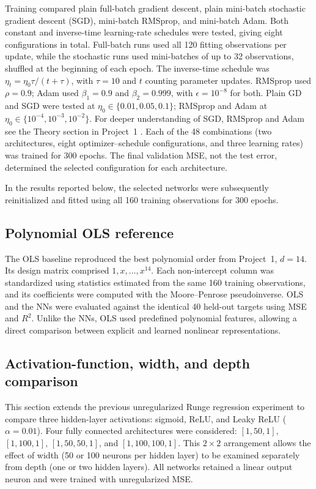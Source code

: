 \documentclass[aps,rmp,reprint,amsmath,amssymb,graphicx,longbibliography]{revtex4-1}
\begin{document}
Training compared plain full-batch gradient descent, plain mini-batch
stochastic gradient descent (SGD), mini-batch RMSprop, and mini-batch
Adam. Both constant and inverse-time learning-rate schedules were
tested, giving eight configurations in total. Full-batch runs used all
120 fitting observations per update, while the stochastic runs used
mini-batches of up to 32 observations, shuffled at the beginning of each
epoch. The inverse-time schedule was
$\eta_t=\eta_0\tau/(t+\tau)$, with $\tau=10$ and $t$ counting parameter
updates. RMSprop used $\rho=0.9$; Adam used
$\beta_1=0.9$ and $\beta_2=0.999$, with $\epsilon=10^{-8}$ for both.
Plain GD and SGD were tested at
$\eta_0\in\{0.01,0.05,0.1\}$; RMSprop and Adam at
$\eta_0\in\{10^{-4},10^{-3},10^{-2}\}$. For deeper understanding of SGD, RMSprop and Adam see the Theory section in Project~1 \cite{Project_1}. Each of the 48 combinations
(two architectures, eight optimizer--schedule configurations, and three
learning rates) was trained for 300 epochs. The final validation MSE,
not the test error, determined the selected configuration for each
architecture.

In the results reported below, the selected networks were subsequently
reinitialized and fitted using all 160 training observations for
300 epochs. 


\subsection{Polynomial OLS reference}
\label{subsec:partb_ols}

The OLS baseline reproduced the best polynomial order from Project~1\cite{Project_1},
$d=14$. Its design matrix comprised $1,x,\ldots,x^{14}$. Each
non-intercept column was standardized using statistics estimated from
the same 160 training observations, and its coefficients were computed
with the Moore--Penrose pseudoinverse. OLS and the NNs were
evaluated against the identical 40 held-out targets using MSE and
$R^2$. Unlike the NNs, OLS used predefined polynomial
features, allowing a direct comparison between explicit and learned
nonlinear representations.


\subsection{Activation-function, width, and depth comparison}
\label{subsec:partc_methods}

This section extends the previous unregularized Runge regression experiment to compare three hidden-layer activations: sigmoid, ReLU, and
Leaky ReLU ($\alpha=0.01$). Four fully connected architectures were
considered: $[1,50,1]$, $[1,100,1]$, $[1,50,50,1]$, and
$[1,100,100,1]$. This $2\times2$ arrangement allows the effect of
width (50 or 100 neurons per hidden layer) to be examined separately
from depth (one or two hidden layers). All networks retained a linear
output neuron and were trained with unregularized MSE.
\end{document}
